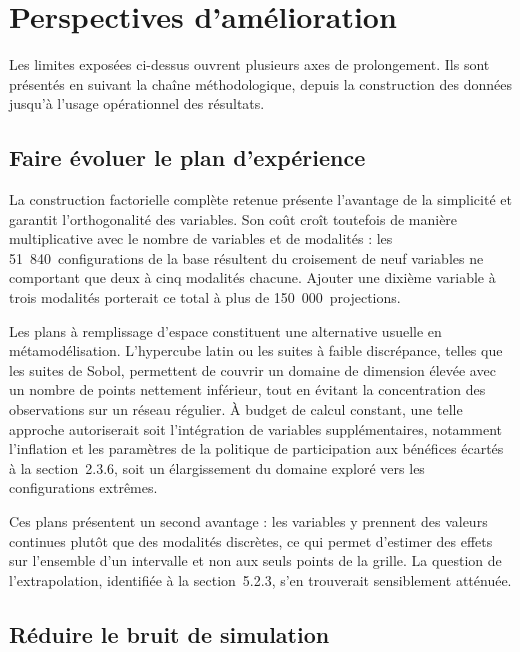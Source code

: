 \section{Perspectives d'amélioration}

Les limites exposées ci-dessus ouvrent plusieurs axes de prolongement. Ils sont présentés en suivant la chaîne méthodologique, depuis la construction des données jusqu'à l'usage opérationnel des résultats.

\subsection{Faire évoluer le plan d'expérience}

La construction factorielle complète retenue présente l'avantage de la simplicité et garantit l'orthogonalité des variables. Son coût croît toutefois de manière multiplicative avec le nombre de variables et de modalités : les 51~840~configurations de la base résultent du croisement de neuf variables ne comportant que deux à cinq modalités chacune. Ajouter une dixième variable à trois modalités porterait ce total à plus de 150~000~projections.

Les plans à remplissage d'espace constituent une alternative usuelle en métamodélisation. L'hypercube latin ou les suites à faible discrépance, telles que les suites de Sobol, permettent de couvrir un domaine de dimension élevée avec un nombre de points nettement inférieur, tout en évitant la concentration des observations sur un réseau régulier. À budget de calcul constant, une telle approche autoriserait soit l'intégration de variables supplémentaires, notamment l'inflation et les paramètres de la politique de participation aux bénéfices écartés à la section~2.3.6, soit un élargissement du domaine exploré vers les configurations extrêmes.

Ces plans présentent un second avantage : les variables y prennent des valeurs continues plutôt que des modalités discrètes, ce qui permet d'estimer des effets sur l'ensemble d'un intervalle et non aux seuls points de la grille. La question de l'extrapolation, identifiée à la section~5.2.3, s'en trouverait sensiblement atténuée.

\subsection{Réduire le bruit de simulation}

